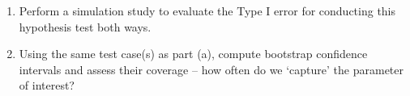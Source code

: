 \documentclass{article}\usepackage[]{graphicx}\usepackage[]{xcolor}
\begin{document}
\begin{enumerate}
\begin{enumerate}
  \item Perform a simulation study to evaluate the Type I error for conducting this
hypothesis test both ways.
  \item Using the same test case(s) as part (a), compute bootstrap confidence 
  intervals and assess their coverage -- how often do we `capture' the parameter
of interest?
\end{enumerate}
\end{enumerate}

\end{document}

